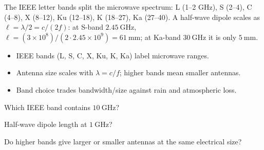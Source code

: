 \begin{workedexample}
The IEEE letter bands split the microwave spectrum: L (1--2 GHz), S (2--4),
C (4--8), X (8--12), Ku (12--18), K (18--27), Ka (27--40). A half-wave dipole
scales as $\ell = \lambda/2 = c/(2f)$: at S-band $2.45\ \text{GHz}$,
$\ell = (3\times10^8)/(2\cdot2.45\times10^9) = 61\ \text{mm}$; at Ka-band
$30\ \text{GHz}$ it is only $5\ \text{mm}$.
\end{workedexample}

\begin{keytakeaways}
\begin{itemize}[leftmargin=1.4em,itemsep=2pt]
\item IEEE bands (L, S, C, X, Ku, K, Ka) label microwave ranges.
\item Antenna size scales with $\lambda = c/f$; higher bands mean smaller antennas.
\item Band choice trades bandwidth/size against rain and atmospheric loss.
\end{itemize}
\end{keytakeaways}

\begin{exercises}
\item Which IEEE band contains $10\ \text{GHz}$?
\item Half-wave dipole length at $1\ \text{GHz}$?
\item Do higher bands give larger or smaller antennas at the same electrical size?
\end{exercises}

